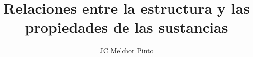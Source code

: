 \documentclass[12pt,addpoints,answers]{guia}
\title{Relaciones entre la estructura y las propiedades de las sustancias}
\author{JC Melchor Pinto}
\begin{document}
\pagestyle{headandfoot}

\INFO
\printanswers
\begin{multicols}{2}
    
\end{multicols}



\end{document}
